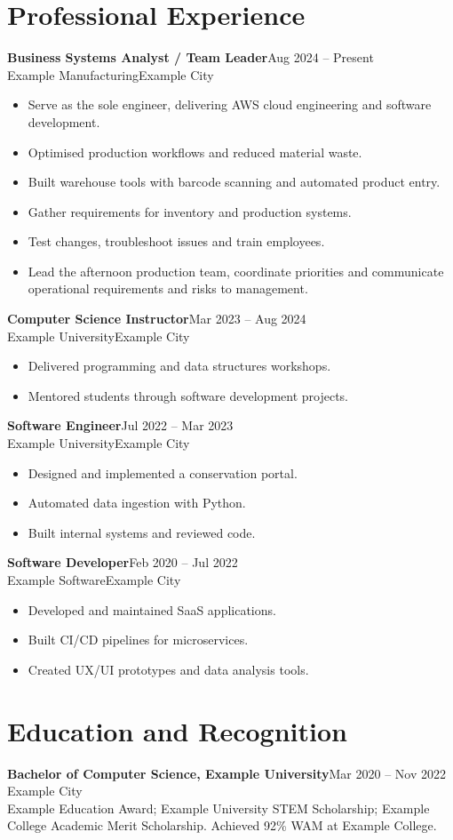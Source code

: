 \documentclass[10pt,a4paper]{article}
\newcommand{\role}[4]{\textbf{#1}\hfill{\small #2}\\{\color{muted}#3\hfill #4}\par}
\begin{document}
\section{Professional Experience}
\role{Business Systems Analyst / Team Leader}{Aug 2024 -- Present}{Example Manufacturing}{Example City}
\begin{itemize}
\item Serve as the sole engineer, delivering AWS cloud engineering and software development.
\item Optimised production workflows and reduced material waste.
\item Built warehouse tools with barcode scanning and automated product entry.
\item Gather requirements for inventory and production systems.
\item Test changes, troubleshoot issues and train employees.
\item Lead the afternoon production team, coordinate priorities and communicate operational requirements and risks to management.
\end{itemize}
\vspace{4pt}
\role{Computer Science Instructor}{Mar 2023 -- Aug 2024}{Example University}{Example City}
\begin{itemize}
\item Delivered programming and data structures workshops.
\item Mentored students through software development projects.
\end{itemize}
\vspace{4pt}
\role{Software Engineer}{Jul 2022 -- Mar 2023}{Example University}{Example City}
\begin{itemize}
\item Designed and implemented a conservation portal.
\item Automated data ingestion with Python.
\item Built internal systems and reviewed code.
\end{itemize}
\vspace{4pt}
\role{Software Developer}{Feb 2020 -- Jul 2022}{Example Software}{Example City}
\begin{itemize}
\item Developed and maintained SaaS applications.
\item Built CI/CD pipelines for microservices.
\item Created UX/UI prototypes and data analysis tools.
\end{itemize}

\section{Education and Recognition}
\textbf{Bachelor of Computer Science, Example University}\hfill Mar 2020 -- Nov 2022\\
Example City\\
{\small Example Education Award; Example University STEM Scholarship; Example College Academic Merit Scholarship. Achieved 92\% WAM at Example College.}
\end{document}
